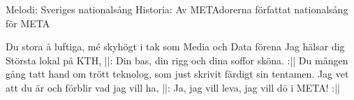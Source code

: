 \begin{song}

\begin{songmeta}
Melodi: Sveriges nationalsång 
Historia: Av METAdorerna författat nationalsång för META 
\end{songmeta}

\begin{songtext}
Du stora å luftiga, mé skyhögt i tak
som Media och Data förena
Jag hälsar dig Största lokal på KTH,
||: Din bas, din rigg och dina soffor sköna. :||
Du mången gång tatt hand om trött teknolog,
som just skrivit färdigt sin tentamen.
Jag vet att du är och förblir vad jag vill ha,
||: Ja, jag vill leva, jag vill dö i META! :||
\end{songtext}
\end{song}
